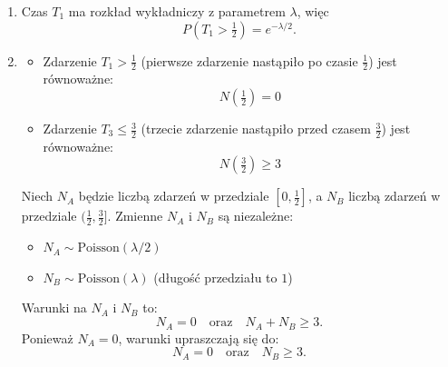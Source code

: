 \begin{enumerate}
	      Korzystamy z niezależności \(X\) i \(Y\): \(P(X=k, Y=l) = P(X=k)P(Y=l)\).
	      \begin{align*}
		      P\bigl(N(1)\ge 1 \cap N(3)\le 2\bigr) & = P(X=1, Y=0) + P(X=1, Y=1) + P(X=2, Y=0)                                               \\
		                                            & = P(X=1)P(Y=0) + P(X=1)P(Y=1) + P(X=2)P(Y=0)                                            \\
		                                            & = \left(\lambda e^{-\lambda}\right) \cdot \left(e^{-2\lambda}\right)                    \\
		                                            & \quad + \left(\lambda e^{-\lambda}\right) \cdot \left(2\lambda e^{-2\lambda}\right)     \\
		                                            & \quad + \left(\frac{\lambda^2}{2} e^{-\lambda}\right) \cdot \left(e^{-2\lambda}\right)  \\
		                                            & = \lambda e^{-3\lambda} + 2\lambda^2 e^{-3\lambda} + \frac{1}{2}\lambda^2 e^{-3\lambda} \\
		                                            & = e^{-3\lambda} \left( \lambda + 2\lambda^2 + \frac{1}{2}\lambda^2 \right)              \\
		                                            & = \lambda e^{-3\lambda} \left( 1 + \frac{5}{2}\lambda \right)
	      \end{align*}

	\item[(iv)]
	      Czas \(T_1\) ma rozkład wykładniczy z parametrem \(\lambda\), więc
	      \[
		      P\!\left(T_1>\tfrac12\right)=e^{-\lambda/2}.
	      \]

	\item[(v)]
	      \begin{itemize}
		      \item Zdarzenie \(T_1 > \tfrac12\) (pierwsze zdarzenie nastąpiło po czasie \(\tfrac12\)) jest równoważne:
		            \[N\!\left(\tfrac12\right) = 0\]
		      \item Zdarzenie \(T_3 \le \tfrac32\) (trzecie zdarzenie nastąpiło przed czasem \(\tfrac32\)) jest równoważne:
		            \[N\!\left(\tfrac32\right) \ge 3\]
	      \end{itemize}

	      Niech \(N_A\) będzie liczbą zdarzeń w przedziale \([0, \tfrac12]\), a \(N_B\) liczbą zdarzeń w przedziale \((\tfrac12, \tfrac32]\). Zmienne \(N_A\) i \(N_B\) są niezależne:
	      \begin{itemize}
		      \item \(N_A \sim \mathrm{Poisson}(\lambda/2)\)
		      \item \(N_B \sim \mathrm{Poisson}(\lambda)\) (długość przedziału to \(1\))
	      \end{itemize}
	      Warunki na \(N_A\) i \(N_B\) to:
	      \[N_A = 0 \quad \text{oraz} \quad N_A + N_B \ge 3.\]
	      Ponieważ \(N_A=0\), warunki upraszczają się do:
	      \[N_A = 0 \quad \text{oraz} \quad N_B \ge 3.\]


\end{enumerate}
